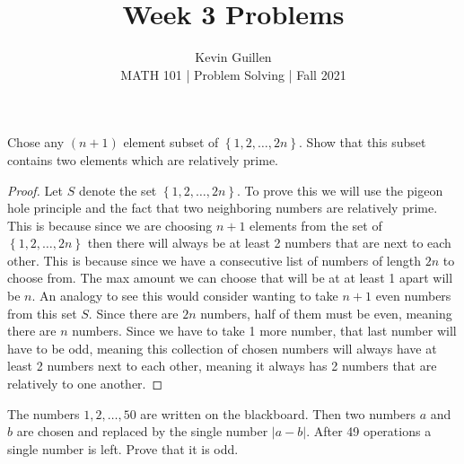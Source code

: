 \documentclass[11pt]{article}
\newenvironment{problem}[2][Problem\!]{\begin{trivlist}
\item[\hskip \labelsep {\bfseries #1}\hskip \labelsep {\bfseries #2}]}{\end{trivlist}}
\newcommand{\abs}[1]{\left\lvert#1\right\rvert} %
\newcommand{\set}[1]{\left\{#1\right\}} %
\begin{document}
 
\title{Week 3 Problems}
\author{Kevin Guillen\\[0.5em]
MATH 101 | Problem Solving | Fall 2021}
\date{} 
\maketitle


\begin{tcolorbox}
    \begin{problem}{10/8 OC (30.)}
        Chose any $(n+1)$ element subset of $\set{1,2,\dots, 2n}$. Show that this subset contains two elements which are relatively prime. 
    \end{problem}
\end{tcolorbox}
\begin{proof}
    Let $S$ denote the set $\set{1,2,\dots,2n}$. To prove this we will use the pigeon hole principle and the fact that two neighboring numbers are relatively prime. This is because since we are choosing $n+1$ elements from the set of $\set{1,2,\dots, 2n}$ then there will always be at least 2 numbers that are next to each other. This is because since we have a consecutive list of numbers of length $2n$ to choose from. The max amount we can choose that will be at at least 1 apart will be $n$. An analogy to see this would consider wanting to take $n+1$ even numbers from this set $S$. Since there are $2n$ numbers, half of them must be even, meaning there are $n$ numbers. Since we have to take 1 more number, that last number will have to be odd, meaning this collection of chosen numbers will always have at least 2 numbers next to each other, meaning it always has 2 numbers that are relatively to one another. 
\end{proof}

\begin{tcolorbox}
    \begin{problem}{10/11 IC (44.)} 
        The numbers $1,2,\dots, 50$ are written on the blackboard. Then two numbers $a$ and $b$ are chosen and replaced by the single number $\abs{a-b}$. After 49 operations a single number is left. Prove that it is odd. 
    \end{problem}
\end{tcolorbox}
\end{document}
